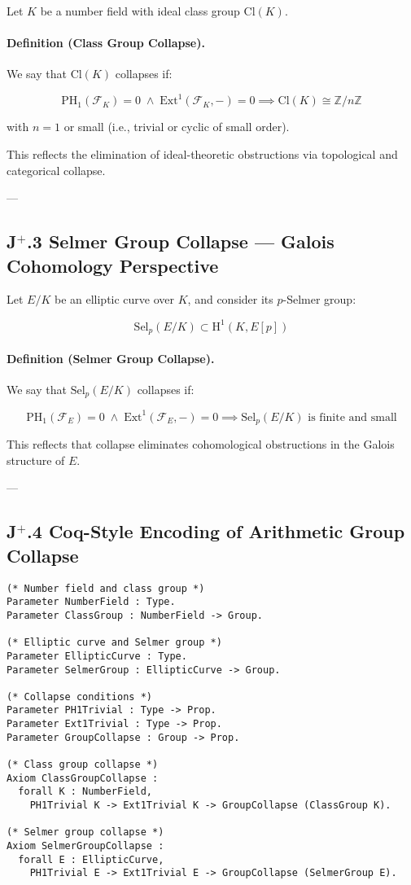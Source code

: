\documentclass[11pt]{article}
\begin{document}
Let $K$ be a number field with ideal class group $\mathrm{Cl}(K)$.

\paragraph{Definition (Class Group Collapse).}

We say that $\mathrm{Cl}(K)$ collapses if:

\[
\mathrm{PH}_1(\mathcal{F}_K) = 0 \;\land\; \mathrm{Ext}^1(\mathcal{F}_K, -) = 0 \implies \mathrm{Cl}(K) \cong \mathbb{Z}/n\mathbb{Z}
\]

with $n = 1$ or small (i.e., trivial or cyclic of small order).

This reflects the elimination of ideal-theoretic obstructions via topological and categorical collapse.

---

\subsection*{J$^{+}$.3 Selmer Group Collapse — Galois Cohomology Perspective}

Let $E/K$ be an elliptic curve over $K$, and consider its $p$-Selmer group:

\[
\mathrm{Sel}_p(E/K) \subset \mathrm{H}^1(K, E[p])
\]

\paragraph{Definition (Selmer Group Collapse).}

We say that $\mathrm{Sel}_p(E/K)$ collapses if:

\[
\mathrm{PH}_1(\mathcal{F}_E) = 0 \;\land\; \mathrm{Ext}^1(\mathcal{F}_E, -) = 0 \implies \mathrm{Sel}_p(E/K) \text{ is finite and small}
\]

This reflects that collapse eliminates cohomological obstructions in the Galois structure of $E$.

---

\subsection*{J$^{+}$.4 Coq-Style Encoding of Arithmetic Group Collapse}

\begin{lstlisting}[language=Coq]
(* Number field and class group *)
Parameter NumberField : Type.
Parameter ClassGroup : NumberField -> Group.

(* Elliptic curve and Selmer group *)
Parameter EllipticCurve : Type.
Parameter SelmerGroup : EllipticCurve -> Group.

(* Collapse conditions *)
Parameter PH1Trivial : Type -> Prop.
Parameter Ext1Trivial : Type -> Prop.
Parameter GroupCollapse : Group -> Prop.

(* Class group collapse *)
Axiom ClassGroupCollapse :
  forall K : NumberField,
    PH1Trivial K -> Ext1Trivial K -> GroupCollapse (ClassGroup K).

(* Selmer group collapse *)
Axiom SelmerGroupCollapse :
  forall E : EllipticCurve,
    PH1Trivial E -> Ext1Trivial E -> GroupCollapse (SelmerGroup E).
\end{lstlisting}
\end{document}
